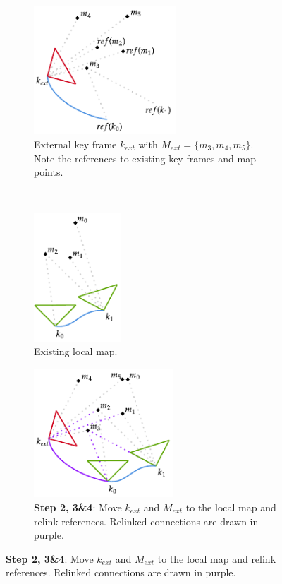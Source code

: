 \begin{figure}[h]
    \centering

    \begin{subfigure}[t]{0.3\textwidth}
        \centering
        \includegraphics[height=1.9in]{figures/external_key_frame_insertion_1.pdf}
        \caption{External key frame $k_{ext}$ with $M_{ext}=\{m_3, m_4, m_5\}$. Note the references to existing key frames and map points.}
    \end{subfigure}%
    ~
    \begin{subfigure}[t]{0.3\textwidth}
        \centering
        \includegraphics[height=1.9in]{figures/external_key_frame_insertion_2.pdf}
        \caption{Existing local map.}
    \end{subfigure}%
    \par\bigskip
    \begin{subfigure}[t]{0.333\textwidth}
        \centering
        \includegraphics[height=1.9in]{figures/external_key_frame_insertion_3.pdf}
        \caption{\textbf{Step 2, 3\&4}: Move $k_{ext}$ and $M_{ext}$ to the local map and relink references. Relinked connections are drawn in purple.}

\end{subfigure}
\end{figure}

